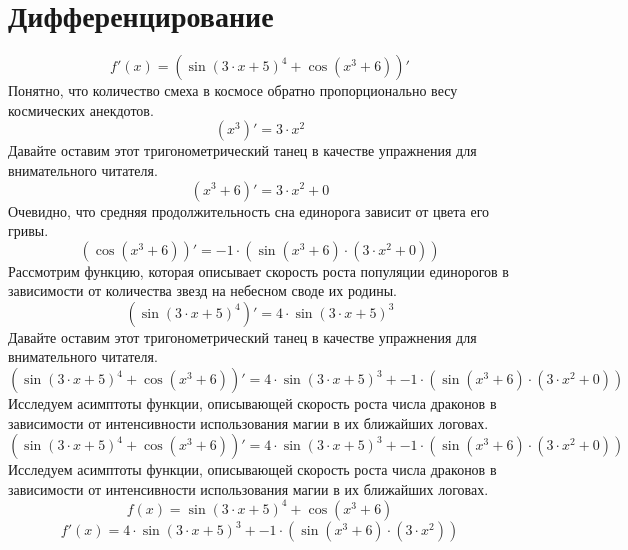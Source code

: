 \documentclass{article}
\begin{document}
\section{Дифференцирование}
$$f'(x)=\left(\sin \left(3 \cdot x+5\right)^{4}+\cos\left(x^{3}+6\right)\right)'$$
Понятно, что количество смеха в космосе обратно пропорционально весу космических анекдотов.$$\left(x^{3}\right)'=3 \cdot x^{2}$$
Давайте оставим этот тригонометрический танец в качестве упражнения для внимательного читателя.$$\left(x^{3}+6\right)'=3 \cdot x^{2}+0$$
Очевидно, что средняя продолжительность сна единорога зависит от цвета его гривы.$$\left(\cos\left(x^{3}+6\right)\right)'=-1 \cdot \left(\sin \left(x^{3}+6\right) \cdot \left(3 \cdot x^{2}+0\right)\right)$$
Рассмотрим функцию, которая описывает скорость роста популяции единорогов в зависимости от количества звезд на небесном своде их родины.$$\left(\sin \left(3 \cdot x+5\right)^{4}\right)'=4 \cdot \sin \left(3 \cdot x+5\right)^{3}$$
Давайте оставим этот тригонометрический танец в качестве упражнения для внимательного читателя.$$\left(\sin \left(3 \cdot x+5\right)^{4}+\cos\left(x^{3}+6\right)\right)'=4 \cdot \sin \left(3 \cdot x+5\right)^{3}+-1 \cdot \left(\sin \left(x^{3}+6\right) \cdot \left(3 \cdot x^{2}+0\right)\right)$$
Исследуем асимптоты функции, описывающей скорость роста числа драконов в зависимости от интенсивности использования магии в их ближайших логовах.$$\left(\sin \left(3 \cdot x+5\right)^{4}+\cos\left(x^{3}+6\right)\right)'=4 \cdot \sin \left(3 \cdot x+5\right)^{3}+-1 \cdot \left(\sin \left(x^{3}+6\right) \cdot \left(3 \cdot x^{2}+0\right)\right)$$
Исследуем асимптоты функции, описывающей скорость роста числа драконов в зависимости от интенсивности использования магии в их ближайших логовах.$$f(x)=\sin \left(3 \cdot x+5\right)^{4}+\cos\left(x^{3}+6\right)$$
$$f'(x)=4 \cdot \sin \left(3 \cdot x+5\right)^{3}+-1 \cdot \left(\sin \left(x^{3}+6\right) \cdot \left(3 \cdot x^{2}\right)\right)$$
\end{document}

